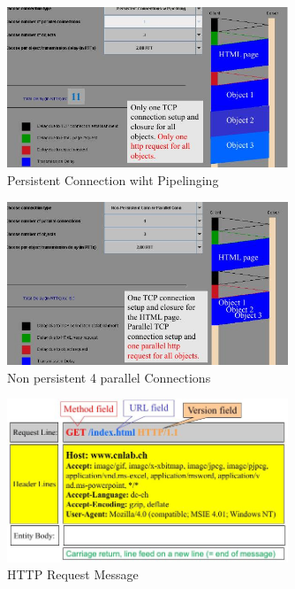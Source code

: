 \documentclass[ngerman,a4paper,12pt]{scrreprt}
\begin{document}
\begin{figure}[H]
	\centering
	\includegraphics[width=0.75\textwidth]{img/V14.17.jpg}
	\caption{Persistent Connection wiht Pipelinging}
	\label{}
\end{figure}

\begin{figure}[H]
	\centering
	\includegraphics[width=0.75\textwidth]{img/V14.18.jpg}
	\caption{Non persistent 4 parallel Connections}
	\label{}
\end{figure}



\begin{figure}[H]
	\centering
	\includegraphics[width=0.75\textwidth]{img/V14.8.jpg}
	\caption{HTTP Request Message}
	\label{}
\end{figure}
\end{document}
